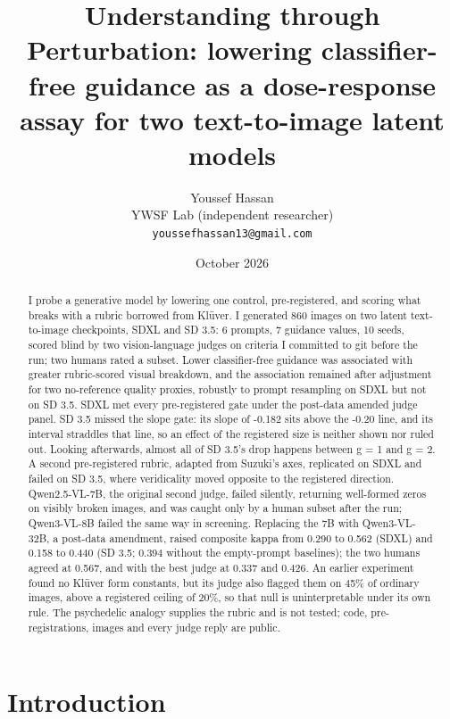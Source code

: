 \documentclass[11pt]{article}
\title{Understanding through Perturbation: lowering classifier-free guidance as
a dose-response assay for two text-to-image latent models}
\author{Youssef Hassan\\ \small YWSF Lab (independent
researcher)\\ \small \texttt{youssefhassan13@gmail.com}}
\date{October 2026}
\begin{document}
\maketitle
\begin{abstract}
I probe a generative model by lowering one control, pre-registered, and scoring
what breaks with a rubric borrowed from Klüver. I generated 860 images on two
latent text-to-image checkpoints, SDXL and SD 3.5: 6 prompts, 7 guidance values,
10 seeds, scored blind by two vision-language judges on criteria I committed to
git before the run; two humans rated a subset. Lower classifier-free guidance
was associated with greater rubric-scored visual breakdown, and the association
remained after adjustment for two no-reference quality proxies, robustly to
prompt resampling on SDXL but not on SD 3.5. SDXL met every pre-registered gate
under the post-data amended judge panel. SD 3.5 missed the slope gate: its slope
of -0.182 sits above the -0.20 line, and its interval straddles that line, so an
effect of the registered size is neither shown nor ruled out. Looking
afterwards, almost all of SD 3.5's drop happens between g = 1 and g = 2. A
second pre-registered rubric, adapted from Suzuki's axes, replicated on SDXL and
failed on SD 3.5, where veridicality moved opposite to the registered direction.
Qwen2.5-VL-7B, the original second judge, failed silently, returning well-formed
zeros on visibly broken images, and was caught only by a human subset after the
run; Qwen3-VL-8B failed the same way in screening. Replacing the 7B with
Qwen3-VL-32B, a post-data amendment, raised composite kappa from 0.290 to 0.562
(SDXL) and 0.158 to 0.440 (SD 3.5; 0.394 without the empty-prompt baselines);
the two humans agreed at 0.567, and with the best judge at 0.337 and 0.426. An
earlier experiment found no Klüver form constants, but its judge also flagged
them on 45\% of ordinary images, above a registered ceiling of 20\%, so that
null is uninterpretable under its own rule. The psychedelic analogy supplies the
rubric and is not tested; code, pre-registrations, images and every judge reply
are public.
\end{abstract}
\section{Introduction}\label{introduction}
\end{document}
